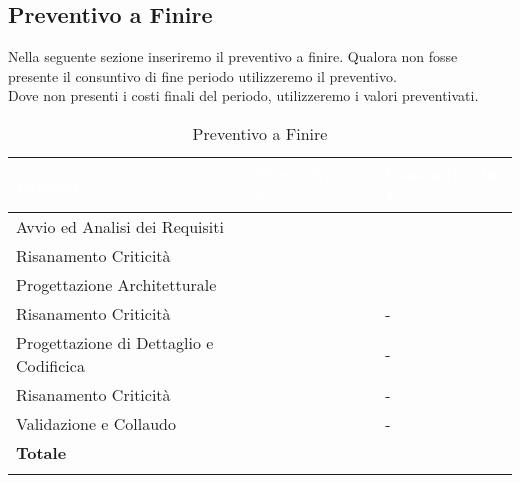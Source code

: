 \subsection{Preventivo a Finire}
\label{caption_paf}

Nella seguente sezione inseriremo il preventivo a finire. Qualora non fosse presente il consuntivo di fine periodo utilizzeremo il preventivo. \\
Dove non presenti i costi finali del periodo, utilizzeremo i valori preventivati. \\

\begin{longtable}{| C{.30\textwidth}| C{.15\textwidth}| C{.20\textwidth}|}
\hline
{}\textbf{\textcolor{white}{Periodo}} & \textbf{\textcolor{white}{Preventivo in \euro}} & \textbf{\textcolor{white}{Consuntivo in \euro}} \\
\hline
Avvio ed Analisi dei Requisiti &  &  \\
\hline
{}Risanamento Criticità &   &  \\
\hline
Progettazione Architetturale &  &  \\
\hline
{} Risanamento Criticità &  & - \\
\hline
Progettazione di Dettaglio e Codificica &  & - \\
\hline
{} Risanamento Criticità &   & - \\
\hline
Validazione e Collaudo &   & - \\
\hline
{}\textbf{Totale} &   &   \\
\hline
\caption{Preventivo a Finire}
\label{paf}
\end{longtable}

